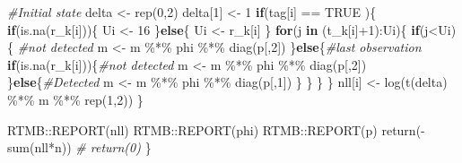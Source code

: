 \documentclass[
]{article}
\newenvironment{Shaded}{\begin{snugshade}}{\end{snugshade}}
\newcommand{\CommentTok}[1]{\textcolor[rgb]{0.56,0.35,0.01}{\textit{#1}}}
\newcommand{\ConstantTok}[1]{\textcolor[rgb]{0.00,0.00,0.00}{#1}}
\newcommand{\ControlFlowTok}[1]{\textcolor[rgb]{0.13,0.29,0.53}{\textbf{#1}}}
\newcommand{\DecValTok}[1]{\textcolor[rgb]{0.00,0.00,0.81}{#1}}
\newcommand{\FunctionTok}[1]{\textcolor[rgb]{0.00,0.00,0.00}{#1}}
\newcommand{\NormalTok}[1]{#1}
\newcommand{\OtherTok}[1]{\textcolor[rgb]{0.56,0.35,0.01}{#1}}
\newcommand{\SpecialCharTok}[1]{\textcolor[rgb]{0.00,0.00,0.00}{#1}}
\begin{document}
\begin{Shaded}
\begin{Highlighting}[]
    \CommentTok{\#Initial state}
\NormalTok{    delta }\OtherTok{\textless{}{-}} \FunctionTok{rep}\NormalTok{(}\DecValTok{0}\NormalTok{,}\DecValTok{2}\NormalTok{)}
\NormalTok{    delta[}\DecValTok{1}\NormalTok{] }\OtherTok{\textless{}{-}} \DecValTok{1}
    \ControlFlowTok{if}\NormalTok{(tag[i] }\SpecialCharTok{==} \ConstantTok{TRUE}\NormalTok{ )\{}
      \ControlFlowTok{if}\NormalTok{(}\FunctionTok{is.na}\NormalTok{(r\_k[i]))\{}
\NormalTok{        Ui }\OtherTok{\textless{}{-}} \DecValTok{16}
\NormalTok{      \}}\ControlFlowTok{else}\NormalTok{\{}
\NormalTok{        Ui }\OtherTok{\textless{}{-}}\NormalTok{ r\_k[i]}
\NormalTok{      \}}
      \ControlFlowTok{for}\NormalTok{(j }\ControlFlowTok{in}\NormalTok{ (t\_k[i]}\SpecialCharTok{+}\DecValTok{1}\NormalTok{)}\SpecialCharTok{:}\NormalTok{Ui)\{}
        \ControlFlowTok{if}\NormalTok{(j}\SpecialCharTok{\textless{}}\NormalTok{Ui)\{ }\CommentTok{\#not detected}
\NormalTok{          m }\OtherTok{\textless{}{-}}\NormalTok{ m }\SpecialCharTok{\%*\%}\NormalTok{ phi }\SpecialCharTok{\%*\%} \FunctionTok{diag}\NormalTok{(p[,}\DecValTok{2}\NormalTok{])}
\NormalTok{        \}}\ControlFlowTok{else}\NormalTok{\{}\CommentTok{\#last observation}
          \ControlFlowTok{if}\NormalTok{(}\FunctionTok{is.na}\NormalTok{(r\_k[i]))\{}\CommentTok{\#not detected}
\NormalTok{            m }\OtherTok{\textless{}{-}}\NormalTok{ m }\SpecialCharTok{\%*\%}\NormalTok{ phi }\SpecialCharTok{\%*\%} \FunctionTok{diag}\NormalTok{(p[,}\DecValTok{2}\NormalTok{])}
\NormalTok{          \}}\ControlFlowTok{else}\NormalTok{\{}\CommentTok{\#Detected}
\NormalTok{            m }\OtherTok{\textless{}{-}}\NormalTok{ m }\SpecialCharTok{\%*\%}\NormalTok{ phi }\SpecialCharTok{\%*\%} \FunctionTok{diag}\NormalTok{(p[,}\DecValTok{1}\NormalTok{])}
\NormalTok{          \}}
\NormalTok{        \}}
\NormalTok{      \}}
\NormalTok{    \}}
\NormalTok{    nll[i] }\OtherTok{\textless{}{-}} \FunctionTok{log}\NormalTok{(}\FunctionTok{t}\NormalTok{(delta) }\SpecialCharTok{\%*\%}\NormalTok{ m }\SpecialCharTok{\%*\%} \FunctionTok{rep}\NormalTok{(}\DecValTok{1}\NormalTok{,}\DecValTok{2}\NormalTok{))}
\NormalTok{  \}}

\NormalTok{  RTMB}\SpecialCharTok{::}\FunctionTok{REPORT}\NormalTok{(nll)  }
\NormalTok{  RTMB}\SpecialCharTok{::}\FunctionTok{REPORT}\NormalTok{(phi)  }
\NormalTok{  RTMB}\SpecialCharTok{::}\FunctionTok{REPORT}\NormalTok{(p)  }
  \FunctionTok{return}\NormalTok{(}\SpecialCharTok{{-}}\FunctionTok{sum}\NormalTok{(nll}\SpecialCharTok{*}\NormalTok{n))}
  \CommentTok{\# return(0)}
\NormalTok{\}}
\end{Highlighting}
\end{Shaded}
\end{document}

